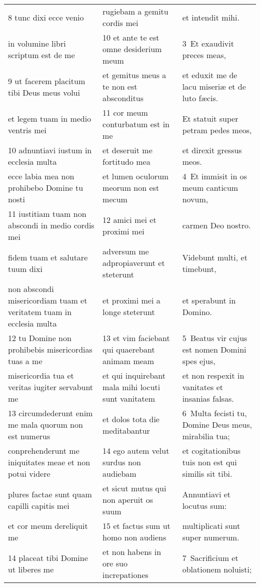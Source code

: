 \documentclass{article}
\begin{document}
\begin{longtable}{@{}p{}p{}p{}@{}}
8 tunc dixi ecce venio	&	rugiebam a gemitu cordis mei	&	et intendit mihi.	\\
in volumine libri scriptum est de me	&	10 et ante te est omne desiderium meum	&	3 Et exaudivit preces meas,	\\
9 ut facerem placitum tibi Deus meus volui	&	et gemitus meus a te non est absconditus	&	et eduxit me de lacu miseriæ et de luto fæcis.	\\
et legem tuam in medio ventris mei	&	11 cor meum conturbatum est in me	&	Et statuit super petram pedes meos,	\\
10 adnuntiavi iustum in ecclesia multa	&	et deseruit me fortitudo mea	&	et direxit gressus meos.	\\
ecce labia mea non prohibebo Domine tu nosti	&	et lumen oculorum meorum non est mecum	&	4 Et immisit in os meum canticum novum,	\\
11 iustitiam tuam non abscondi in medio cordis mei	&	12 amici mei et proximi mei	&	carmen Deo nostro.	\\
fidem tuam et salutare tuum dixi	&	adversum me adpropiaverunt et steterunt	&	Videbunt multi, et timebunt,	\\
non abscondi misericordiam tuam et veritatem tuam in ecclesia multa	&	et proximi mei a longe steterunt	&	et sperabunt in Domino.	\\
12 tu Domine non prohibebis misericordias tuas a me	&	13 et vim faciebant qui quaerebant animam meam	&	5 Beatus vir cujus est nomen Domini spes ejus,	\\
misericordia tua et veritas iugiter servabunt me	&	et qui inquirebant mala mihi locuti sunt vanitatem	&	et non respexit in vanitates et insanias falsas.	\\
13 circumdederunt enim me mala quorum non est numerus	&	et dolos tota die meditabantur	&	6 Multa fecisti tu, Domine Deus meus, mirabilia tua;	\\
conprehenderunt me iniquitates meae et non potui videre	&	14 ego autem velut surdus non audiebam	&	et cogitationibus tuis non est qui similis sit tibi.	\\
plures factae sunt quam capilli capitis mei	&	et sicut mutus qui non aperuit os suum	&	Annuntiavi et locutus sum:	\\
et cor meum dereliquit me	&	15 et factus sum ut homo non audiens	&	multiplicati sunt super numerum.	\\
14 placeat tibi Domine ut liberes me	&	et non habens in ore suo increpationes	&	7 Sacrificium et oblationem noluisti;	\\

\end{longtable}
\end{document}
